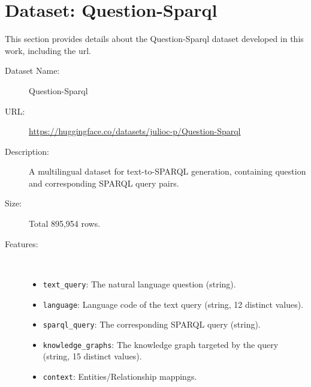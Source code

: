\section{Dataset: Question-Sparql}
This section provides details about the Question-Sparql dataset developed in this work, including the url.

\begin{description}
    \item[Dataset Name:] Question-Sparql
    \item[URL:] \url{https://huggingface.co/datasets/julioc-p/Question-Sparql}
    \item[Description:] A multilingual dataset for text-to-SPARQL generation, containing question and corresponding SPARQL query pairs.
    \item[Size:] Total 895,954 rows.
    \item[Features:]\mbox{}\\
    
        \begin{itemize}
            \item \texttt{text\_query}: The natural language question (string).
            \item \texttt{language}: Language code of the text query (string, 12 distinct values).
            \item \texttt{sparql\_query}: The corresponding SPARQL query (string).
            \item \texttt{knowledge\_graphs}: The knowledge graph targeted by the query (string, 15 distinct values).
            \item \texttt{context}: Entities/Relationship mappings.
        \end{itemize}
\end{description}